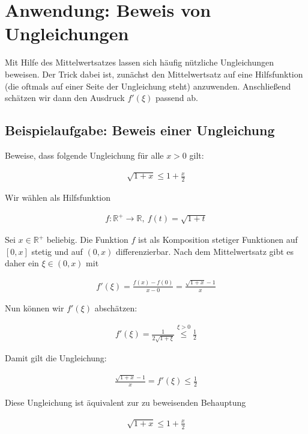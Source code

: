 \documentclass[fontsize=9pt,
               parskip=half-,
               DIV=14,
               listof=chapterentry,
               tocflat]{scrbook}
\begin{document}
\section{Anwendung: Beweis von Ungleichungen}

Mit Hilfe des Mittelwertsatzes lassen sich häufig nützliche Ungleichungen beweisen. Der Trick dabei ist, zunächst den Mittelwertsatz auf eine Hilfsfunktion (die oftmals auf einer Seite der Ungleichung steht) anzuwenden. Anschließend schätzen wir dann den Ausdruck $f'(\xi )$ passend ab.

\subsection{Beispielaufgabe: Beweis einer Ungleichung}

\begin{exercise*}
Beweise, dass folgende Ungleichung für alle $x>0$ gilt:

\begin{align*}
{\sqrt {1+x}}\leq 1+{\frac {x}{2}}
\end{align*}

\end{exercise*}

\begin{proof*}
Wir wählen als Hilfsfunktion

\begin{align*}
f:\mathbb {R} ^{+}\to \mathbb {R} ,\ f(t)={\sqrt {1+t}}
\end{align*}

Sei $x\in \mathbb {R} ^{+}$ beliebig. Die Funktion $f$ ist als Komposition stetiger Funktionen auf $[0,x]$ stetig und auf $(0,x)$ differenzierbar. Nach dem Mittelwertsatz gibt es daher ein $\xi \in (0,x)$ mit

\begin{align*}
f'(\xi )={\frac {f(x)-f(0)}{x-0}}={\frac {{\sqrt {1+x}}-1}{x}}
\end{align*}

Nun können wir $f'(\xi )$ abschätzen:

\begin{align*}
f'(\xi )={\frac {1}{2{\sqrt {1+\xi }}}}{\overset {\xi >0}{\leq }}{\frac {1}{2}}
\end{align*}

Damit gilt die Ungleichung:

\begin{align*}
{\frac {{\sqrt {1+x}}-1}{x}}=f'(\xi )\leq {\frac {1}{2}}
\end{align*}

Diese Ungleichung ist äquivalent zur zu beweisenden Behauptung

\begin{align*}
{\sqrt {1+x}}\leq 1+{\frac {x}{2}}
\end{align*}

\end{proof*}
\end{document}
